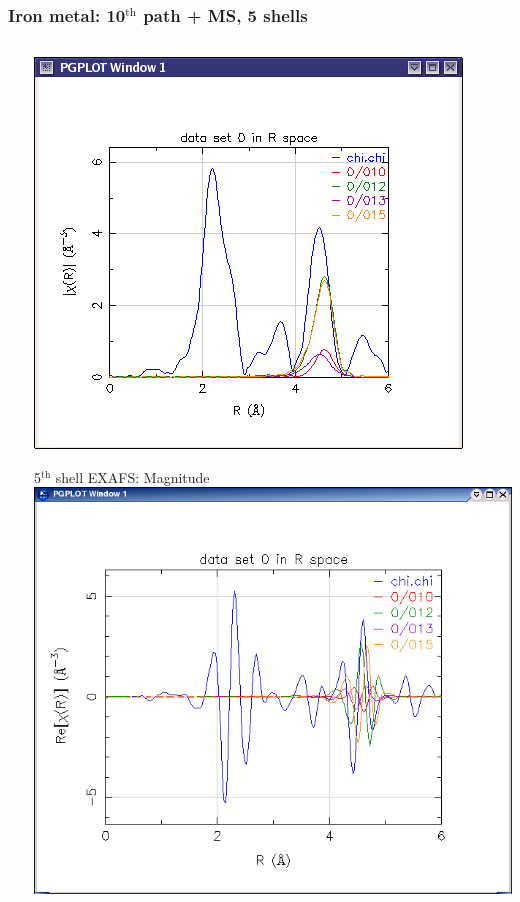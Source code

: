 \documentclass[10pt, xcolor=x11names, compress]{beamer}
\begin{document}
\begin{frame}
  \frametitle{Iron metal: 10$^{\mathrm{th}}$ path + MS, 5 shells}
  \begin{columns}[T]
    \begin{column}{0.05\linewidth}
      ~
    \end{column}
    \begin{column}{0.4\linewidth}
      \begin{center}
        \includegraphics[width=0.75\linewidth]{images/path10}

        5$^{\mathrm{th}}$ shell EXAFS: Magnitude\\[2ex]

        \includegraphics[width=0.75\linewidth]{images/path10_re}


\end{center}
\end{column}
\end{columns}
\end{frame}
\end{document}
